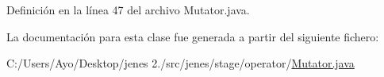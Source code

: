 Definición en la línea 47 del archivo Mutator.\-java.



La documentación para esta clase fue generada a partir del siguiente fichero\-:\begin{DoxyCompactItemize}
\item 
C\-:/\-Users/\-Ayo/\-Desktop/jenes 2./src/jenes/stage/operator/\hyperlink{_mutator_8java}{Mutator.\-java}\end{DoxyCompactItemize}
